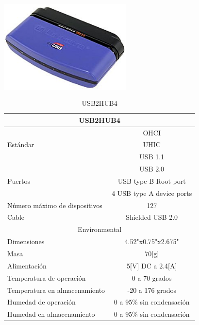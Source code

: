 \documentclass[a4paper,usenames,dvipsnames,svgnames,table]{book}
\begin{document}
\begin{center}
\includegraphics[width=0.5\textwidth]{Figures/Hardware/Partes/Cisco-Linksys.png}
\label{fig:Hardware:Partes:Cisco}
\end{center}

\begin{table}[H]
\begin{center}
\begin{tabular}{|l|l|}%


\hline
\multicolumn{2}{|c|}{USB2HUB4} \\ \hline %
\multirow{3}{1cm}{Estándar} & \multicolumn{1}{|c|}{OHCI}\\ & \multicolumn{1}{|c|}{UHIC}\\ & \multicolumn{1}{|c|}{USB 1.1}\\ & \multicolumn{1}{|c|}{USB 2.0}\\ \hline
Puertos & \multicolumn{1}{|c|}{USB type B Root port}\\ &\multicolumn{1}{|c|}{4 USB type A device ports}\\ \hline
Número máximo de dispositivos & \multicolumn{1}{|c|}{127}\\ \hline
Cable & \multicolumn{1}{|c|}{Shielded USB 2.0}\\ \hline
\multicolumn{2}{|c|}{Environmental}\\ \hline
Dimensiones & \multicolumn{1}{|c|}{4.52"x0.75"x2.675"}\\ \hline
Masa & \multicolumn{1}{|c|}{70[g]}\\ \hline
Alimentación & \multicolumn{1}{|c|}{5[V] DC a 2.4[A]}\\ \hline
Temperatura de operación & \multicolumn{1}{|c|}{0 a 70 grados}\\ \hline
Temperatura en almacenamiento & \multicolumn{1}{|c|}{-20 a 176 grados}\\ \hline
Humedad de operación & \multicolumn{1}{|c|}{0 a 95\% sin condensación}\\ \hline
Humedad en almacenamiento & \multicolumn{1}{|c|}{0 a 95\% sin condensación}\\ \hline

\end{tabular}
\caption{USB2HUB4}
\label{Datos del USB2HUB4}
\end{center}
\end{table}
\end{document}
